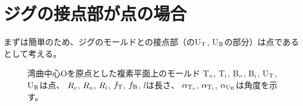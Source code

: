 \section{ジグの接点部が点の場合}
まずは簡単のため、ジグのモールドとの接点部（のU$_\text T$, U$_\text B$の部分）は点であるとして考える。
\begin{figure}[t]
\centering
\begin{Figbox}
\mouldCoordinate
\caption[湾曲中心Oを原点とした複素平面上のモールド]
  {湾曲中心Oを原点とした複素平面上のモールド\newline
   T$_\text o$, T$_\text i$, B$_\text o$, B$_\text i$, U$_\text T$, U$_\text B$は点、
   $R_\text c$, $R_\text o$, $R_\text i$, $f_\text T$, $f_\text B$, $l$は長さ、
   $\alpha_{\text T_\text o}$, $\alpha_{\text T_\text i}$, $\alpha_{\text U_\text B}$は角度を示す。}
\label{fig:mouldOnComplexPlane1}
\end{Figbox}
\end{figure}



